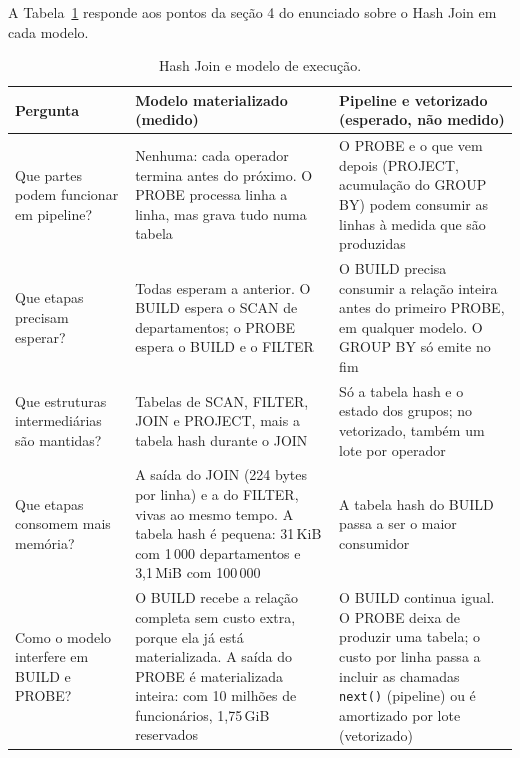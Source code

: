\documentclass[11pt,a4paper]{article}
\begin{document}
A Tabela~\ref{tab:hjmodelo} responde aos pontos da seção 4 do enunciado sobre o Hash Join em cada modelo.

\begin{table}[H]
\centering
\small
\begin{tabular}{@{}p{2.9cm}p{6.5cm}p{6.6cm}@{}}
\toprule
Pergunta & Modelo materializado (medido) & Pipeline e vetorizado (esperado, não medido) \\
\midrule
Que partes podem funcionar em pipeline? & Nenhuma: cada operador termina antes do próximo. O PROBE processa linha a linha, mas grava tudo numa tabela & O PROBE e o que vem depois (PROJECT, acumulação do GROUP BY) podem consumir as linhas à medida que são produzidas \\
Que etapas precisam esperar? & Todas esperam a anterior. O BUILD espera o SCAN de departamentos; o PROBE espera o BUILD e o FILTER & O BUILD precisa consumir a relação inteira antes do primeiro PROBE, em qualquer modelo. O GROUP BY só emite no fim \\
Que estruturas intermediárias são mantidas? & Tabelas de SCAN, FILTER, JOIN e PROJECT, mais a tabela hash durante o JOIN & Só a tabela hash e o estado dos grupos; no vetorizado, também um lote por operador \\
Que etapas consomem mais memória? & A saída do JOIN (224 bytes por linha) e a do FILTER, vivas ao mesmo tempo. A tabela hash é pequena: 31\,KiB com 1\,000 departamentos e 3,1\,MiB com 100\,000 & A tabela hash do BUILD passa a ser o maior consumidor \\
Como o modelo interfere em BUILD e PROBE? & O BUILD recebe a relação completa sem custo extra, porque ela já está materializada. A saída do PROBE é materializada inteira: com 10 milhões de funcionários, 1,75\,GiB reservados & O BUILD continua igual. O PROBE deixa de produzir uma tabela; o custo por linha passa a incluir as chamadas \texttt{next()} (pipeline) ou é amortizado por lote (vetorizado) \\
\bottomrule
\end{tabular}
\caption{Hash Join e modelo de execução.}
\label{tab:hjmodelo}
\end{table}
\end{document}
